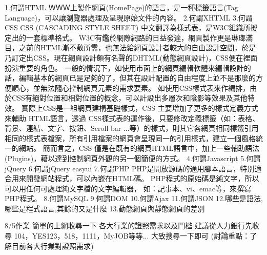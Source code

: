 1.何謂HTML
ＷＷＷ上製作網頁(HomePage)的語言，是一種標籤語言(Tag Language)，可以讓瀏覽器處理及呈現原始文件的內容。
2.何謂XHTML
3.何謂CSS
CSS (CASCADING STYLE SHEET) 中文翻譯為樣式表，是W3C組織所擬定出的一套標準格式。
W3C有鑑於網際網路的日益發達，網頁製作更是琳瑯滿目，之前的HTML漸不敷所需，也無法給網頁設計者較大的自由設計空間，於是乃訂定出CSS。現在網頁設計頗有名聲的DHTML(動態網頁設計)，CSS便在裡面扮演重要的角色。
一般的情況下，如使用市面上的網頁編輯軟體來編輯設計的話，編輯基本的網頁已是足夠的了，但其在設計配置的自由程度上並不是那麼的方便順心，並無法隨心控制網頁元素的需求要素。
如使用CSS樣式表來作編排，由於CSS有絕對位置和相對位置的概念，可以計設出多層次和陰影等效果及其他特效。 
實際上CSS是一組網頁建構基礎樣式，CSS 主要增加了更多的樣式定義方式來輔助 HTML語言，透過 CSS樣式表的運作後，只要修改定義標籤（如：表格、背景、連結、文字、按鈕、Scroll bar ...等）的樣式，則其它各網頁相同標籤引用相同的樣式表檔案，所有引用檔案的網頁會呈現同一的引用樣式，建立一個風格統一的網站。
簡而言之，CSS 僅是在既有的網頁HTML語言中，加上一些輔助語法(Plugins)，藉以達到控制網頁外觀的另一個簡便的方式。
4.何謂Javascript
5.何謂jQuery
6.何謂jQuery easyui
7.何謂PHP
PHP是開放源碼的通用腳本語言，特別適合用來開發網站程式，可以內嵌在HTML碼。
PHP程式的原始碼是純文字，所以可以用任何可處理純文字檔的文字編輯器，
如：記事本、vi、emac等，來撰寫PHP程式。
8.何謂MySQL
9.何謂DOM
10.何謂Ajax
11.何謂JSON
12.哪些是語法,哪些是程式語言,其餘的又是什麼
13.動態網頁與靜態網頁的差別

8/5作業
簡單的上網收尋一下
各大行業的證照需求以及門檻
建議從人力銀行先收尋
104，YES123，518，1111，MyJOB等等...
大致搜尋一下即可
(討論重點：了解目前各大行業對證照需求)

